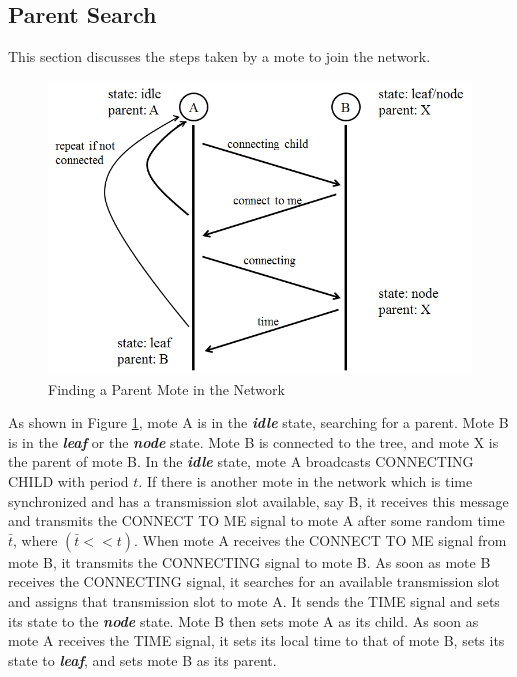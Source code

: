 \subsection{Parent Search}
This section discusses the steps taken by a mote to join the network.
\begin{figure}[htbp]
\centering
\includegraphics[width=\columnwidth]{algorithm1.png}
\caption{Finding a Parent Mote in the Network}
\label{img_algorithm1}
\end{figure}

As shown in Figure \ref{img_algorithm1}, mote A is in the \textit{\textbf{idle}} state, searching for a parent. Mote B is in the \textit{\textbf{leaf}} or the \textit{\textbf{node}} state. Mote B is connected to the tree, and mote X is the parent of mote B. In the \textit{\textbf{idle}} state, mote A broadcasts CONNECTING CHILD with period $t$. If there is another mote in the network which is time synchronized and has a transmission slot available, say B, it receives this message and transmits the CONNECT TO ME signal to mote A after some random time $\bar{t}$, where $(\bar{t} << t)$. When mote A receives the CONNECT TO ME signal from mote B, it transmits the CONNECTING signal to mote B. As soon as mote B receives the CONNECTING signal, it searches for an available transmission slot and assigns that transmission slot to mote A. It sends the TIME signal and sets its state to the \textit{\textbf{node}} state. Mote B then sets mote A as its child. As soon as mote A receives the TIME signal, it sets its local time to that of mote B, sets its state to \textit{\textbf{leaf}}, and sets mote B as its parent.

